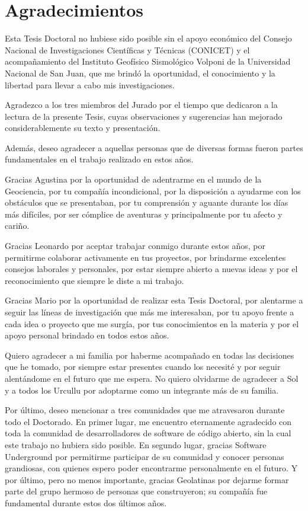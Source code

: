 \chapter*{Agradecimientos}

Esta Tesis Doctoral no hubiese sido posible sin el apoyo económico del Consejo
Nacional de Investigaciones Científicas y Técnicas (CONICET) y el
acompañamiento del Instituto Geofísico Sismológico Volponi de la Universidad
Nacional de San Juan, que me brindó la oportunidad, el conocimiento y la
libertad para llevar a cabo mis investigaciones.

\vspace{1em}

Agradezco a los tres miembros del Jurado por el tiempo que dedicaron a la
lectura de la presente Tesis, cuyas observaciones y sugerencias han mejorado
considerablemente su texto y presentación.

\vspace{1em}

Además, deseo agradecer a aquellas personas que de diversas formas fueron
partes fundamentales en el trabajo realizado en estos años.

Gracias Agustina por la oportunidad de adentrarme en el mundo de la Geociencia,
por tu compañía incondicional, por la disposición a ayudarme con los obstáculos
que se presentaban, por tu comprensión y aguante durante los días más
difíciles, por ser cómplice de aventuras y principalmente por tu afecto
y cariño.

Gracias Leonardo por aceptar trabajar conmigo durante estos años, por
permitirme colaborar activamente en tus proyectos, por brindarme excelentes
consejos laborales y personales, por estar siempre abierto a nuevas ideas y por
el reconocimiento que siempre le diste a mi trabajo.

Gracias Mario por la oportunidad de realizar esta Tesis Doctoral, por alentarme
a seguir las líneas de investigación que más me interesaban, por tu apoyo
frente a cada idea o proyecto que me surgía, por tus conocimientos en la
materia y por el apoyo personal brindado en todos estos años.

Quiero agradecer a mi familia por haberme acompañado en todas las decisiones
que he tomado, por siempre estar presentes cuando los necesité y por seguir
alentándome en el futuro que me espera.
No quiero olvidarme de agradecer a Sol y a todos los Urcullu por adoptarme como
un integrante más de su familia.

Por último, deseo mencionar a tres comunidades que me atravesaron durante todo
el Doctorado.
En primer lugar, me encuentro eternamente agradecido con toda la comunidad de
desarrolladores de software de código abierto, sin la cual este trabajo no
hubiera sido posible.
En segundo lugar, gracias Software Underground por permitirme participar de su
comunidad y conocer personas grandiosas, con quienes espero poder encontrarme
personalmente en el futuro.
Y por último, pero no menos importante, gracias Geolatinas por dejarme formar
parte del grupo hermoso de personas que construyeron; su compañía fue
fundamental durante estos dos últimos años.
